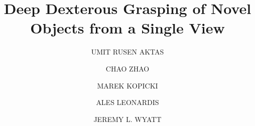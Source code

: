 \documentclass{ws-ijhr}
\begin{document}

%
\catchline{}{}{}{}{}
%

\title{Deep Dexterous Grasping of Novel Objects from a Single View}

\author{UMIT RUSEN AKTAS}

\address{University Department, University Name, Address\\
City, State ZIP/Zone,
Country\\
rusenaktas@gmail.com}

\author{CHAO ZHAO}

\address{Group, Laboratory, Address\\
City, State ZIP/Zone, Country\\
chaozh1@hotmail.com}

\author{MAREK KOPICKI}

\address{Group, Laboratory, Address\\
City, State ZIP/Zone, Country\\
marekkopicki@gmail.com}

\author{ALES LEONARDIS}

\address{Group, Laboratory, Address\\
City, State ZIP/Zone, Country\\
alesleo@gmail.com}

\author{JEREMY L. WYATT}

\address{Group, Laboratory, Address\\
City, State ZIP/Zone, Country\\
jeremy.l.wyatt@gmail.com}

\maketitle

\begin{history}
\end{history}

\begin{abstract}

\end{abstract}

\end{document}
